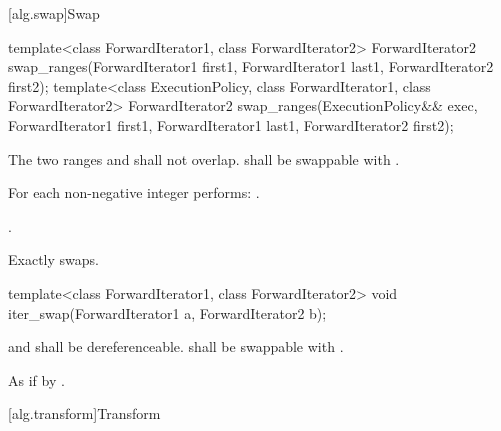 [alg.swap]{Swap}

%
\begin{itemdecl}
template<class ForwardIterator1, class ForwardIterator2>
  ForwardIterator2
    swap_ranges(ForwardIterator1 first1, ForwardIterator1 last1,
                ForwardIterator2 first2);
template<class ExecutionPolicy, class ForwardIterator1, class ForwardIterator2>
  ForwardIterator2
    swap_ranges(ExecutionPolicy&& exec,
                ForwardIterator1 first1, ForwardIterator1 last1,
                ForwardIterator2 first2);
\end{itemdecl}

\begin{itemdescr}
\pnum
\requires
The two ranges 
and
shall not overlap.
 shall be swappable with
.

\pnum
\effects
For each non-negative integer
performs:
.

\pnum
\returns
{}.

\pnum
\complexity
Exactly
swaps.
\end{itemdescr}

%
\begin{itemdecl}
template<class ForwardIterator1, class ForwardIterator2>
  void iter_swap(ForwardIterator1 a, ForwardIterator2 b);
\end{itemdecl}

\begin{itemdescr}
\pnum
\requires
{} and  shall be dereferenceable.  shall be
swappable with .

\pnum
\effects
As if by .
\end{itemdescr}

[alg.transform]{Transform}

